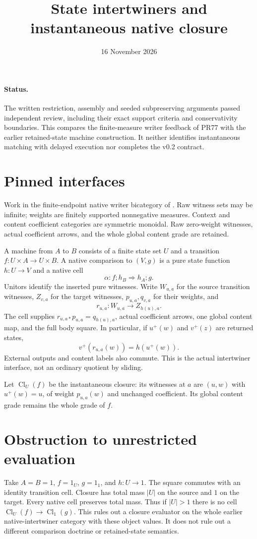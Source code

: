 \documentclass{article}
\title{State intertwiners and instantaneous native closure}
\date{16 November 2026}
\begin{document}
\maketitle
\paragraph{Status.} The written restriction, assembly and seeded subpreserving arguments passed independent review, including their exact support criteria and conservativity boundaries. This compares the finite-measure writer feedback of PR77 with the earlier retained-state machine construction. It neither identifies instantaneous matching with delayed execution nor completes the v0.2 contract.
\section{Pinned interfaces}
Work in the finite-endpoint native writer bicategory of
.
Raw witness sets may be infinite; weights are finitely supported nonnegative measures. Context and content coefficient categories are symmetric monoidal. Raw zero-weight witnesses, actual coefficient arrows, and the whole global content grade are retained.

A machine from $A$ to $B$ consists of a finite state set $U$ and a transition $f:U\times A\to U\times B$. A native comparison to $(V,g)$ is a pure state function $h:U\to V$ and a native cell
\[\alpha:f;h_B\Longrightarrow h_A;g.\]
Unitors identify the inserted pure witnesses. Write $W_{u,a}$ for the source transition witnesses, $Z_{v,a}$ for the target witnesses, $p_{u,a},q_{v,a}$ for their weights, and
\[r_{u,a}:W_{u,a}\to Z_{h(u),a}.\]
The cell supplies $r_{u,a*}p_{u,a}=q_{h(u),a}$, actual coefficient arrows, one global content map, and the full body square. In particular, if $u^+(w)$ and $v^+(z)$ are returned states,
\[v^+(r_{u,a}(w))=h(u^+(w)).\]
External outputs and content labels also commute. This is the actual intertwiner interface, not an ordinary quotient by sliding.

Let $\operatorname{Cl}_U(f)$ be the instantaneous closure: its witnesses at $a$ are $(u,w)$ with $u^+(w)=u$, of weight $p_{u,a}(w)$ and unchanged coefficient. Its global content grade remains the whole grade of $f$.
\section{Obstruction to unrestricted evaluation}
Take $A=B=1$, $f=1_U$, $g=1_1$, and $h:U\to1$. The square commutes with an identity transition cell. Closure has total mass $|U|$ on the source and $1$ on the target. Every native cell preserves total mass. Thus if $|U|>1$ there is no cell $\operatorname{Cl}_U(f)\to\operatorname{Cl}_1(g)$. This rules out a closure evaluator on the whole earlier native-intertwiner category with these object values. It does not rule out a different comparison doctrine or retained-state semantics.
\end{document}
